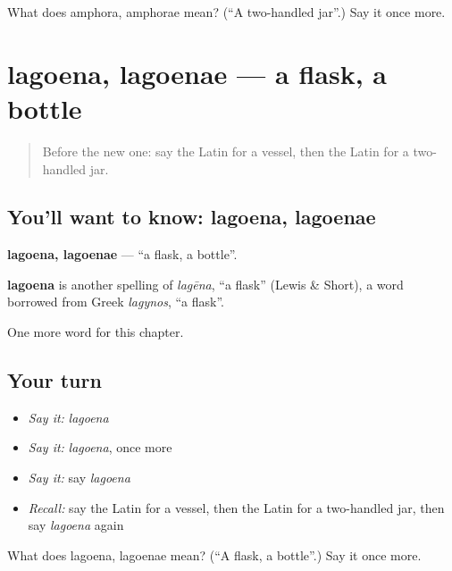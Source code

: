 \begin{tcolorbox}[breakable,colback=teal!4,colframe=teal!35!black,title={Before you move on}]
What does amphora, amphorae mean? (\textquotedblleft{}A two-handled jar\textquotedblright{}.) Say it once more.
\end{tcolorbox}
\section[lagoena, lagoenae]{lagoena, lagoenae — a flask, a bottle}

\label{lesson:LA-C123-lagoena}



\begin{quote}
Before the new one: say the Latin for a vessel, then the Latin for a two-handled jar.
\end{quote}

\subsection*{You'll want to know: lagoena, lagoenae}
\textbf{lagoena, lagoenae} — \textquotedblleft{}a flask, a bottle\textquotedblright{}.

\begin{cousinweb}
\textbf{lagoena} is another spelling of \emph{lagēna}, \textquotedblleft{}a flask\textquotedblright{} (Lewis \& Short), a word borrowed from Greek \emph{lagynos}, \textquotedblleft{}a flask\textquotedblright{}.
\end{cousinweb}

\begin{grammarlens}[title={What you've built}]
One more word for this chapter.
\end{grammarlens}

\subsection*{Your turn}
\begin{itemize}
\raggedright
  \item \emph{Say it:} \emph{lagoena}
  \item \emph{Say it:} \emph{lagoena}, once more
  \item \emph{Say it:} say \emph{lagoena}
  \item \emph{Recall:} say the Latin for a vessel, then the Latin for a two-handled jar, then say \emph{lagoena} again
\end{itemize}

\begin{tcolorbox}[breakable,colback=teal!4,colframe=teal!35!black,title={Before you move on}]
What does lagoena, lagoenae mean? (\textquotedblleft{}A flask, a bottle\textquotedblright{}.) Say it once more.
\end{tcolorbox}
